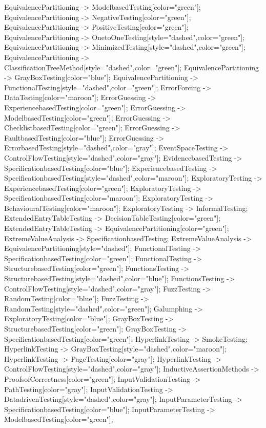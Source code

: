\documentclass{article}
\begin{document}
{EquivalencePartitioning -> ModelbasedTesting[color="green"];
EquivalencePartitioning -> NegativeTesting[color="green"];
EquivalencePartitioning -> PositiveTesting[color="green"];
EquivalencePartitioning -> OnetoOneTesting[style="dashed",color="green"];
EquivalencePartitioning -> MinimizedTesting[style="dashed",color="green"];
EquivalencePartitioning -> ClassificationTreeMethod[style="dashed",color="green"];
EquivalencePartitioning -> GrayBoxTesting[color="blue"];
EquivalencePartitioning -> FunctionalTesting[style="dashed",color="green"];
ErrorForcing -> DataTesting[color="maroon"];
ErrorGuessing -> ExperiencebasedTesting[color="green"];
ErrorGuessing -> ModelbasedTesting[color="green"];
ErrorGuessing -> ChecklistbasedTesting[color="green"];
ErrorGuessing -> FaultbasedTesting[color="blue"];
ErrorGuessing -> ErrorbasedTesting[style="dashed",color="gray"];
EventSpaceTesting -> ControlFlowTesting[style="dashed",color="gray"];
EvidencebasedTesting -> SpecificationbasedTesting[color="blue"];
ExperiencebasedTesting -> SpecificationbasedTesting[style="dashed",color="maroon"];
ExploratoryTesting -> ExperiencebasedTesting[color="green"];
ExploratoryTesting -> SpecificationbasedTesting[color="maroon"];
ExploratoryTesting -> BehaviouralTesting[color="maroon"];
ExploratoryTesting -> InformalTesting;
ExtendedEntryTableTesting -> DecisionTableTesting[color="green"];
ExtendedEntryTableTesting -> EquivalencePartitioning[color="green"];
ExtremeValueAnalysis -> SpecificationbasedTesting;
ExtremeValueAnalysis -> EquivalencePartitioning[style="dashed"];
FunctionalTesting -> SpecificationbasedTesting[color="green"];
FunctionalTesting -> StructurebasedTesting[color="green"];
FunctionsTesting -> StructurebasedTesting[style="dashed",color="blue"];
FunctionsTesting -> ControlFlowTesting[style="dashed",color="gray"];
FuzzTesting -> RandomTesting[color="blue"];
FuzzTesting -> RandomTesting[style="dashed",color="green"];
Galumphing -> ExploratoryTesting[color="blue"];
GrayBoxTesting -> StructurebasedTesting[color="green"];
GrayBoxTesting -> SpecificationbasedTesting[color="green"];
HyperlinkTesting -> SmokeTesting;
HyperlinkTesting -> GrayBoxTesting[style="dashed",color="maroon"];
HyperlinkTesting -> PageTesting[color="gray"];
HyperlinkTesting -> ControlFlowTesting[style="dashed",color="gray"];
InductiveAssertionMethods -> ProofsofCorrectness[color="green"];
InputValidationTesting -> PathTesting[color="gray"];
InputValidationTesting -> DatadrivenTesting[style="dashed",color="gray"];
InputParameterTesting -> SpecificationbasedTesting[color="blue"];
InputParameterTesting -> ModelbasedTesting[color="green"];
}
\end{document}

